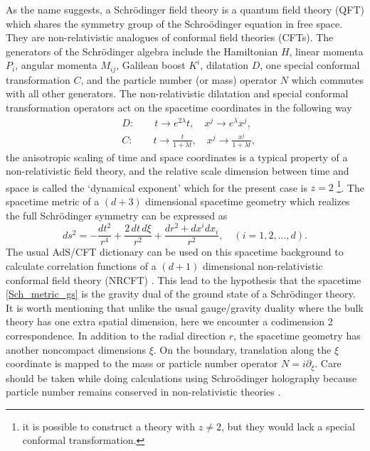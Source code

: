 \documentclass[12pt,a4paper]{article}
\numberwithin{equation}{section}
\begin{document}
As the name suggests, a Schr\"{o}dinger field theory is a quantum field theory (QFT) which shares the symmetry group of the Schro\"{o}dinger equation in free space. They are non-relativistic analogues of conformal field theories (CFTs). The generators of the Schr\"{o}dinger algebra include the Hamiltonian $H$, linear momenta $P_i$, angular momenta $M_{ij}$, Galilean boost $K^i$, dilatation $D$, one special conformal transformation $C$, and the particle number (or mass) operator $N$ which commutes with all other generators. The non-relativistic dilatation and special conformal transformation operators act on the spacetime coordinates in the following way
%
\begin{align*}
    &D:\qquad t \rightarrow e^{2\lambda}t,\quad x^j \rightarrow e^{\lambda}x^j,\\
    &C:\qquad t \rightarrow \frac{t}{1+\lambda t},\quad x^j \rightarrow \frac{x^j}{1+\lambda t},
\end{align*}
%
the anisotropic scaling of time and space coordinates is a typical property of a non-relativistic field theory, and the relative scale dimension between time and space is called the `dynamical exponent' which for the present case is $z=2$ \footnote{it is possible to construct a theory with $z\neq 2$, but they would lack a special conformal transformation.}. The spacetime metric of a $\left(d+3\right)$ dimensional spacetime geometry which realizes the full Schr\"{o}dinger symmetry can be expressed as \cite{Son:2008ye, Balasubramanian:2008dm}
%
\begin{equation} \label{Sch_metric_gs}
    ds^2 = -\frac{dt^2}{r^4} + \frac{2\,dt\, d\xi}{r^2} + \frac{dr^2 + dx^{i}dx_{i}}{r^2}, \quad \left(i = 1, 2, \ldots, d\right).
\end{equation}
%
The usual AdS/CFT dictionary can be used on this spacetime background to calculate correlation functions of a $\left(d+1\right)$ dimensional non-relativistic conformal field theory (NRCFT) \cite{Balasubramanian:2008dm}. This lead to the hypothesis that the spacetime \eqref{Sch_metric_gs} is the gravity dual of the ground state of a Schr\"{o}dinger theory. It is worth mentioning that unlike the usual gauge/gravity duality where the bulk theory has one extra spatial dimension, here we encounter a codimension 2 correspondence. In addition to the radial direction $r$, the spacetime geometry has another noncompact dimensions $\xi$. On the boundary, translation along the $\xi$ coordinate is mapped to the mass or particle number operator $N = i\partial_{\xi}$. Care should be taken while doing calculations using Schro\"{o}dinger holography because particle number remains conserved in non-relativistic theories .
\end{document}
